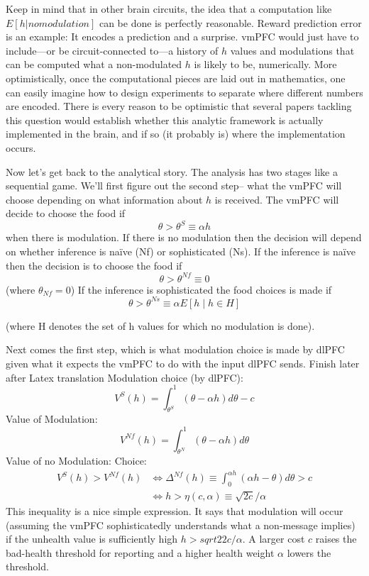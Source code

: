 \documentclass{article}
\begin{document}
Keep in mind that in other brain circuits, the idea that a computation like $E[h|no modulation]$ can be done is perfectly reasonable. Reward prediction error is an example: It encodes a prediction and a surprise. vmPFC would just have to include—or be circuit-connected to—a history of $h$ values and modulations that can be computed what a non-modulated $h$ is likely to be, numerically. 
More optimistically, once the computational pieces are laid out in mathematics, one can easily imagine how to design experiments to separate where different numbers are encoded. There is every reason to be optimistic that several papers tackling this question would establish whether this analytic framework is actually implemented in the brain, and if so (it probably is) where the implementation occurs. 

Now let’s get back to the analytical story. The analysis has two stages like a sequential game. We’ll first figure out the second step-- what the vmPFC will choose depending on what information about $h$ is received. The vmPFC will decide to choose the food if
\[
\theta>\theta^{S} \equiv \alpha h
\]
when there is modulation. 
If there is no modulation then the decision will depend on whether inference is naïve (Nf) or sophisticated (Ns). If the inference is naïve then the decision is to choose the food if 
\begin{equation*}
	\theta>\theta^{N f} \equiv 0
	\end{equation*}
(where $\theta_{Nf}=0$)
If the inference is sophisticated the food choices is made if 
\begin{equation*}
	\theta>\theta^{N s} \equiv \alpha E[h \mid h \in H]
	\end{equation*}

(where H denotes the set of h values for which no modulation is done).

Next comes the first step, which is what modulation choice is made by dlPFC given what it expects the vmPFC to do with the input dlPFC sends.
Finish later after Latex translation  
Modulation choice (by dlPFC):
\begin{equation*}
	V^{S}(h)=\int_{\theta^{S}}^{1}(\theta-\alpha h) d \theta-c
	\end{equation*}
Value of Modulation:  
\begin{equation*}
	V^{N f}(h)=\int_{\theta^{N}}^{1}(\theta-\alpha h) d \theta
	\end{equation*}
Value of no Modulation: 
Choice:
\begin{equation}
	\begin{aligned}
	V^{S}(h)>V^{N f}(h) & \Leftrightarrow \Delta^{N f}(h) \equiv \int_{0}^{\alpha h}(\alpha h-\theta) d \theta>c \\
	& \Leftrightarrow h>\eta(c, \alpha) \equiv \sqrt{2 c} / \alpha
	\end{aligned}
	\end{equation}
	This inequality is a nice simple expression. It says that modulation will occur (assuming the vmPFC sophisticatedly understands what a non-message implies) if the unhealth value is sufficiently high $h>sqrt{2}{2c}/\alpha$. A larger cost $c$ raises the bad-health threshold for reporting and a higher health weight $\alpha$ lowers the threshold. 
\end{document}
